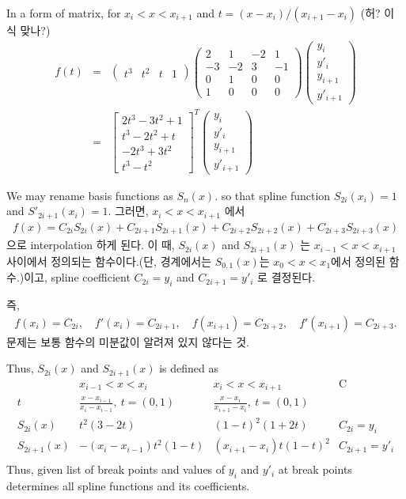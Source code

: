 \documentclass[10pt]{book}
\newcommand{\bea}{\begin{eqnarray}}
\newcommand{\eea}{\end{eqnarray}}
\newcommand{\no}{\nonumber \\}
\begin{document}
In a form of matrix, for $x_i<x<x_{i+1}$ and $t=(x-x_i)/(x_{i+1}-x_i)$
(허? 이 식 맞나?)
\bea 
f(t)&=&\left( \begin{array}{cccc} t^3 & t^2 & t & 1\end{array} \right)
     \left( \begin{array}{cccc} 2 & 1 & -2 & 1 \\
                                -3 & -2  & 3 & -1 \\
                                0 & 1 & 0 & 0 \\
                                1 & 0 & 0 & 0 \end{array} \right)  
     \left(\begin{array}{c} y_i \\ y'_i \\ y_{i+1} \\ y'_{i+1} \end{array}\right) \no 
    &=&\left[ \begin{array}{c} 2 t^3-3t^2+1 \\
                               t^3-2t^2+t \\
                               -2 t^3 +3t^2 \\
                               t^3-t^2 
              \end{array} \right]^T  
         \left(\begin{array}{c} y_i \\ y'_i \\ y_{i+1} \\ y'_{i+1} \end{array}\right)                             
\eea 

 We may rename basis functions as $S_{n}(x)$.
so that spline function $S_{2i}(x_i)=1$ and 
$S'_{2i+1}(x_i)=1$.
그러면, $x_i<x<x_{i+1}$ 에서
\bea
f(x)=C_{2i} S_{2i}(x)+C_{2i+1}S_{2i+1}(x)+C_{2i+2}S_{2i+2}(x)
    +C_{2i+3}S_{2i+3}(x)
\eea
으로 interpolation 하게 된다. 이 때, $S_{2i}(x)$ and $S_{2i+1}(x)$
는 $x_{i-1}<x<x_{i+1}$ 사이에서 정의되는 함수이다.(단, 경계에서는
$S_{0,1}(x)$는 $x_0<x<x_1$에서 정의된 함수.)이고, spline coefficient
$C_{2i}=y_i$ and $C_{2i+1}=y'_i$ 로 결정된다.

즉,
\bea 
f(x_i)=C_{2i},\quad f'(x_i)=C_{2i+1},\quad 
f(x_{i+1})=C_{2i+2},\quad f'(x_{i+1})=C_{2i+3}.
\eea 
문제는 보통 함수의 미분값이 알려져 있지 않다는 것. 

Thus, $S_{2i}(x)$ and $S_{2i+1}(x)$ is defined as
\begin{equation}
\begin{array}{c|c|c|c}
      &  x_{i-1}<x<x_i & x_i<x<x_{i+1} & \mbox{C}\\ \hline
  t   & \frac{x-x_{i-1}}{x_i-x_{i-1}},\ t=(0,1) 
      & \frac{x-x_i}{x_{i+1}-x_i},\ t=(0,1) 
      & \\
  S_{2i}(x) & t^2(3-2t)    & (1-t)^2(1+2t) & C_{2i}=y_i\\
  S_{2i+1}(x) & -(x_i-x_{i-1})t^2(1-t) & (x_{i+1}-x_i)t(1-t)^2 
              & C_{2i+1}=y'_i\\
\end{array}
\end{equation}
Thus, given list of break points and values of $y_i$ and $y'_i$
at break points determines all spline functions and 
its coefficients.
\end{document}
